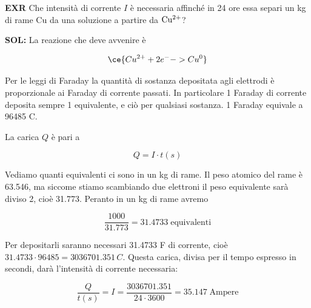 \vspace{0.2cm}\textbf{EXR} Che intensità di corrente $I$ è necessaria affinché in 24 ore essa separi un kg di rame Cu da una soluzione a partire da $\rm Cu^{2+}$?

\vspace{0.2cm}\textbf{SOL:} La reazione che deve avvenire è

$$\ce{Cu^{2+} + 2e^- -> Cu^0}$$

Per le leggi di Faraday la quantità di sostanza depositata agli elettrodi è proporzionale ai Faraday di corrente passati. In particolare 1 Faraday di corrente deposita sempre 1 equivalente, e ciò per qualsiasi sostanza. 1 Faraday equivale a 96485 C.

La carica $Q$ è pari a

$$Q=I \cdot t(s)$$

Vediamo quanti equivalenti ci sono in un kg di rame. Il peso atomico del rame è 63.546, ma siccome stiamo scambiando due elettroni il peso equivalente sarà diviso 2, cioè 31.773. Peranto in un kg di rame avremo

$$\frac{1000}{31.773} = 31.4733 \; \text{equivalenti}$$

Per depositarli saranno necessari 31.4733 F di corrente, cioè $31.4733 \cdot 96485 = 3036701.351 \, C$. Questa carica, divisa per il tempo espresso in secondi, darà l'intensità di corrente necessaria:

$$\frac{Q}{t(s)} = I = \frac{3036701.351}{24 \cdot 3600} = 35.147 \; \text{Ampere}$$
